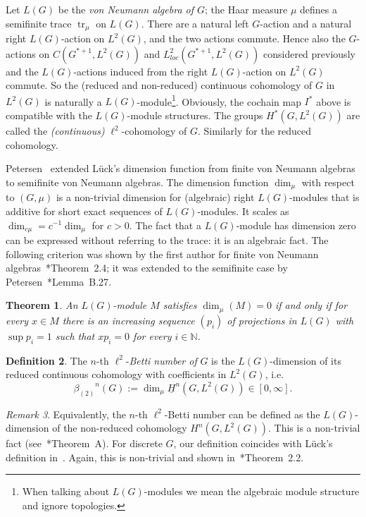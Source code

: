 \documentclass[10pt]{amsart}
\theoremstyle{plain}
\newtheorem{thm}{Theorem}
\theoremstyle{definition}
\newtheorem{defn}[thm]{Definition}
\theoremstyle{remark}
\newtheorem{rem}[thm]{Remark}
\begin{document}
Let $L(G)$ be the \emph{von Neumann algebra of $G$}; the Haar measure $\mu$ defines a semifinite trace ${\operatorname{tr}}_\mu$ on $L(G)$. There are a natural left $G$-action and a natural right $L(G)$-action on $L^2(G)$, and the two actions commute. Hence also the $G$-actions on 
$C(G^{\ast+1}, L^2(G))$ and ${L^2_{loc}}(G^{\ast+1}, L^2(G))$ considered previously and the $L(G)$-actions induced from the right $L(G)$-action on $L^2(G)$ commute. So the (reduced and non-reduced) continuous cohomology of $G$ in $L^2(G)$ is naturally a $L(G)$-module\footnote{When talking about $L(G)$-modules we mean the algebraic module structure and ignore topologies.}. Obviously, the cochain map $I^\ast$ above is compatible with the $L(G)$-module structures. The groups 
	$H^\ast(G, L^2(G))$ are called the \emph{(continuous)} $\ell^2$-cohomology of $G$. Similarly for the reduced cohomology. 

  Petersen~\cite{petersen} extended L\"uck's dimension function from finite von Neumann algebras to semifinite von Neumann algebras. The dimension function ${\operatorname{dim}}_\mu$ with respect to $(G,\mu)$ is a non-trivial dimension for (algebraic) right $L(G)$-modules that is additive for short exact sequences of $L(G)$-modules.
    It scales as ${\operatorname{dim}}_{c\mu}=c^{-1}{\operatorname{dim}}_{\mu}$ for $c>0$.
    The fact that a $L(G)$-module has dimension zero can be expressed without referring to the trace: it is an algebraic fact.
    The following criterion was shown by the first author for finite von Neumann algebras~\cite{sauer-groupoids}*{Theorem~2.4}; it was extended to the semifinite case by Petersen~\cite{petersen}*{Lemma~B.27}.

    \begin{thm}\label{thm: local criterion}
	    An $L(G)$-module $M$ satisfies ${\operatorname{dim}}_\mu(M)=0$ if and only if
	    for every $x\in M$ there is an increasing sequence $(p_i)$ of projections in $L(G)$ with $\sup p_i=1$
	    such that $xp_i=0$ for every $i\in {{\mathbb N}}$.
    \end{thm}
\begin{defn}
    The $n$-th $\ell^2$-\emph{Betti number of} $G$ is the
    $L(G)$-dimension of its reduced continuous cohomology with coefficients in $L^2(G)$, i.e.
    \[ {\beta_{(2)}}^n(G):={\operatorname{dim}}_\mu \underline{H}^n(G,L^2(G))\in [0,\infty].\]
\end{defn}
\begin{rem}\label{rem: equivalent definitions of l2-Betti}
Equivalently, the $n$-th $\ell^2$-Betti number can be defined
as the $L(G)$-dimension of the
non-reduced cohomology $H^n(G, L^2(G))$. This is a non-trivial fact  (see~\cite{petersen+kyed+vaes}*{Theorem~A}). For discrete $G$, our definition coincides with L\"uck's definition in~\cite{luck}. Again, this is non-trivial and shown in~\cite{peterson+thom}*{Theorem~2.2}.
\end{rem}
\end{document}
